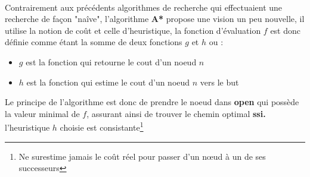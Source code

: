 \paragraph{}
Contrairement aux précédents algorithmes de recherche qui effectuaient une recherche de façon "naîve", l'algorithme \textbf{A* }propose une vision un peu nouvelle, il utilise la notion de coût et celle d'heuristique, la fonction d'évaluation $f$ est donc définie comme étant la somme de deux fonctions $g$ et $h$ ou : \\
	\begin{itemize}
		\item $g$ est la fonction  qui retourne le cout d'un noeud $n$
		\item $h$ est la fonction  qui estime le cout d'un noeud $n$ vers le but
	\end{itemize} 
Le principe de l'algorithme est donc de prendre le noeud dans \textbf{open} qui possède la valeur minimal de $f$, assurant ainsi de trouver le chemin optimal \textbf{ssi.} l'heuristique $h$ choisie est consistante\footnote[2]{Ne surestime jamais le coût réel pour passer d'un nœud à un de ses successeurs}
